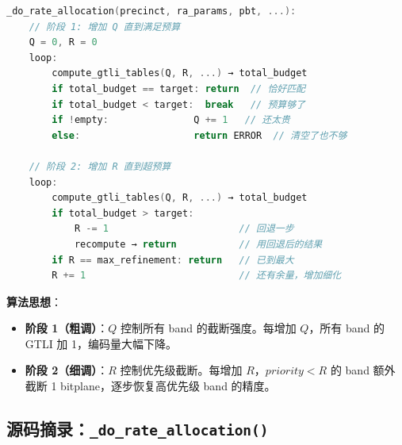 \begin{lstlisting}[language=C,numbers=none]
_do_rate_allocation(precinct, ra_params, pbt, ...):
    // 阶段 1: 增加 Q 直到满足预算
    Q = 0, R = 0
    loop:
        compute_gtli_tables(Q, R, ...) → total_budget
        if total_budget == target: return  // 恰好匹配
        if total_budget < target:  break   // 预算够了
        if !empty:               Q += 1   // 还太贵
        else:                    return ERROR  // 清空了也不够

    // 阶段 2: 增加 R 直到超预算
    loop:
        compute_gtli_tables(Q, R, ...) → total_budget
        if total_budget > target:
            R -= 1                       // 回退一步
            recompute → return           // 用回退后的结果
        if R == max_refinement: return   // 已到最大
        R += 1                           // 还有余量，增加细化
\end{lstlisting}

\textbf{算法思想}：
\begin{itemize}
  \item \textbf{阶段 1（粗调）}：$Q$ 控制所有 band 的截断强度。每增加 $Q$，所有 band 的 GTLI 加 1，编码量大幅下降。
  \item \textbf{阶段 2（细调）}：$R$ 控制优先级截断。每增加 $R$，$\mathit{priority} < R$ 的 band 额外截断 1 bitplane，逐步恢复高优先级 band 的精度。
\end{itemize}

\subsection{源码摘录：\texttt{\_do\_rate\_allocation()}}

